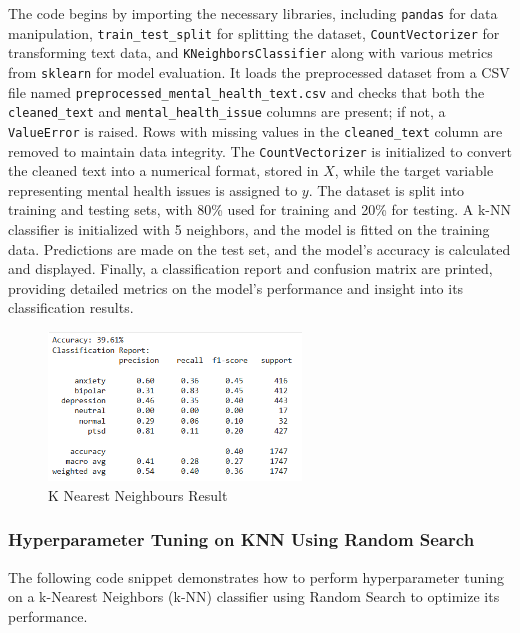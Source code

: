 \noindent
The code begins by importing the necessary libraries, including \texttt{pandas} for data manipulation, \texttt{train\_test\_split} for splitting the dataset, \texttt{CountVectorizer} for transforming text data, and \texttt{KNeighborsClassifier} along with various metrics from \texttt{sklearn} for model evaluation. It loads the preprocessed dataset from a CSV file named \newline
\texttt{preprocessed\_mental\_health\_text.csv} and checks that both the \texttt{cleaned\_text} and \texttt{mental\_health\_issue} columns are present; if not, a \texttt{ValueError} is raised. Rows with missing values in the \texttt{cleaned\_text} column are removed to maintain data integrity. The \texttt{CountVectorizer} is initialized to convert the cleaned text into a numerical format, stored in \(X\), while the target variable representing mental health issues is assigned to \(y\). The dataset is split into training and testing sets, with 80\% used for training and 20\% for testing. A k-NN classifier is initialized with 5 neighbors, and the model is fitted on the training data. Predictions are made on the test set, and the model's accuracy is calculated and displayed. Finally, a classification report and confusion matrix are printed, providing detailed metrics on the model's performance and insight into its classification results.

\begin{figure}[h!]  
    \centering
    \includegraphics[width=0.6\textwidth]{Images/Output KNN.png}  
    \caption{K Nearest Neighbours Result}
    \label{KNN}  %
\end{figure}

\subsubsection{Hyperparameter Tuning on KNN Using Random Search}
\noindent
The following code snippet demonstrates how to perform hyperparameter tuning on a k-Nearest Neighbors (k-NN) classifier using Random Search to optimize its performance.

